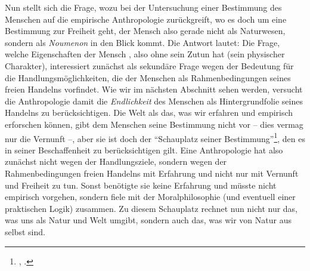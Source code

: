 Nun stellt sich die Frage, wozu  bei der Untersuchung einer
Bestimmung des Menschen auf die empirische Anthropologie zurückgreift, wo es
doch um eine Bestimmung zur Freiheit geht, der Mensch also gerade nicht als
Naturwesen, sondern als \emph{Noumenon} in den Blick kommt. Die Antwort lautet:
Die Frage, welche Eigenschaften der Mensch , also ohne
sein Zutun hat (sein physischer Charakter), interessiert zunächst als sekundäre
Frage wegen der Bedeutung für die Handlungsmöglichkeiten, die der Menschen als
Rahmenbedingungen seines freien Handelns vorfindet. Wie wir im nächsten
Abschnitt sehen werden, versucht die Anthropologie damit die \emph{Endlichkeit} des
Menschen als Hintergrundfolie seines Handelns zu berücksichtigen. Die Welt als
das, was wir erfahren und empirisch erforschen können, gibt dem Menschen seine
Bestimmung nicht vor -- dies vermag nur die Vernunft --, aber sie ist doch der
\enquote{Schauplatz seiner Bestimmung}\footnote{\cite[A~12]{Kant:VondenverschiedenenRassenderMenschen1977},
\cite[II: 443.18]{Kant:GesammelteWerke1900ff.}.}, den es in seiner
Beschaffenheit zu berücksichtigen gilt. Eine Anthropologie hat also
zunächst nicht wegen der Handlungsziele, sondern wegen der Rahmenbedingungen
freien Handelns mit Erfahrung und nicht nur mit Vernunft und Freiheit zu tun.
Sonst benötigte sie keine Erfahrung und müsste nicht empirisch vorgehen, sondern
fiele mit der Moralphilosophie (und eventuell einer praktischen Logik) zusammen.
Zu diesem Schauplatz rechnet  nun nicht nur das, was uns
als Natur und Welt umgibt, sondern auch das, was wir von Natur aus selbst sind.



